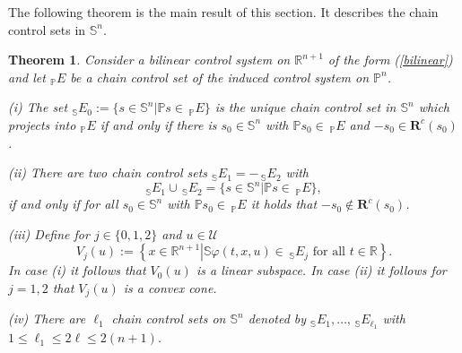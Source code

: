 \documentclass[preprint,12pt]{elsarticle}
\newtheorem{theorem}{Theorem}
\begin{document}
The following theorem is the main result of this section. It describes the
chain control sets in $\mathbb{S}^{n}$.

\begin{theorem}
\label{Theorem_twoS}Consider a bilinear control system on $\mathbb{R}^{n+1}$
of the form (\ref{bilinear}) and let $_{\mathbb{P}}E$ be a chain control set
of the induced control system on $\mathbb{P}^{n}$.

(i) The set $_{\mathbb{S}}E_{0}:=\{s\in\mathbb{S}^{n}\left\vert \mathbb{P}%
s\in\,_{\mathbb{P}}E\right.  \}$ is the unique chain control set in
$\mathbb{S}^{n}$ which projects into $_{\mathbb{P}}E$ if and only if there is
$s_{0}\in\mathbb{S}^{n}$ with $\mathbb{P}s_{0}\in\,_{\mathbb{P}}E$ and
$-s_{0}\in\mathbf{R}^{c}(s_{0})$.

(ii) There are two chain control sets $_{\mathbb{S}}E_{1}=-\,_{\mathbb{S}%
}E_{2}$ with%
\begin{equation}
_{\mathbb{S}}E_{1}\cup\,_{\mathbb{S}}E_{2}=\{s\in\mathbb{S}^{n}\left\vert
\mathbb{P}s\in\,_{\mathbb{P}}E\right.  \}, \label{union}%
\end{equation}
if and only if for all $s_{0}\in\mathbb{S}^{n}$ with $\mathbb{P}s_{0}%
\in\,_{\mathbb{P}}E$ it holds that $-s_{0}\not \in \mathbf{R}^{c}(s_{0})$.

(iii) Define for $j\in\{0,1,2\}$ and $u\in\mathcal{U}$%
\[
V_{j}(u):=\left\{  x\in\mathbb{R}^{n+1}\left\vert \mathbb{S}\varphi
(t,x,u)\in\,_{\mathbb{S}}E_{j}\text{ for all }t\in\mathbb{R}\right.  \right\}
.
\]
In case (i) it follows that $V_{0}(u)$ is a linear subspace. In case (ii) it
follows for $j=1,2$ that $V_{j}(u)$ is a convex cone.

(iv) There are $\ell_{1}$ chain control sets on $\mathbb{S}^{n}$ denoted by
$_{\mathbb{S}}E_{1},\ldots,\allowbreak\,_{\mathbb{S}}E_{\ell_{1}}$ with
$1\leq\ell_{1}\leq2\ell\leq2(n+1)$.
\end{theorem}
\end{document}
